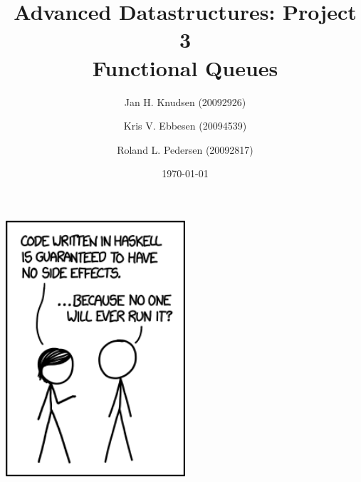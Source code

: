 \documentclass[a4paper, 12pt]{article}
\title{Advanced Datastructures: Project 3\\
Functional Queues}
\date{\today}
\author{Jan H. Knudsen (20092926)
\and
Kris V. Ebbesen (20094539)
\and
Roland L. Pedersen (20092817)
}
\begin{document}
\maketitle
\begin{center}
	\includegraphics[width=0.5\textwidth]{haskell.png}
\end{center}
\newpage
\tableofcontents
\newpage















 
\end{document}
